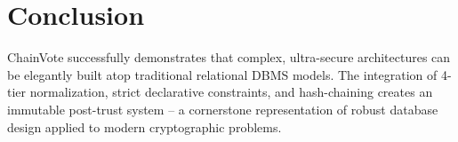 \documentclass[12pt, a4paper]{article}
\begin{document}
\section{Conclusion}
ChainVote successfully demonstrates that complex, ultra-secure architectures can be elegantly built atop traditional relational DBMS models. The integration of 4-tier normalization, strict declarative constraints, and hash-chaining creates an immutable post-trust system -- a cornerstone representation of robust database design applied to modern cryptographic problems.
\end{document}
